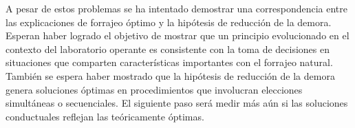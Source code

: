\documentclass[a4paper,12pt]{article}
\begin{document}
A pesar de estos problemas se ha intentado demostrar una correspondencia entre las explicaciones de forrajeo óptimo y la hipótesis de reducción de la demora. Esperan haber logrado el objetivo de mostrar que un principio evolucionado en el contexto del laboratorio operante es consistente con la toma de decisiones en situaciones que comparten características importantes con el forrajeo natural. También se espera haber mostrado que la hipótesis de reducción de la demora genera soluciones óptimas en procedimientos que involucran elecciones simultáneas o secuenciales. El siguiente paso será medir más aún si las soluciones conductuales reflejan las teóricamente óptimas.
\end{document}
